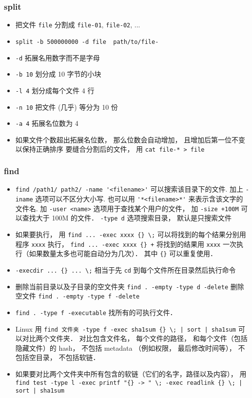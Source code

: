 \subsubsection{split}
\begin{itemize}
\item 把文件 \verb`file` 分割成 \verb`file-01`, \verb`file-02`, ...
\item \verb`split -b 500000000 -d file  path/to/file-`
\item \verb`-d` 拓展名用数字而不是字母
\item \verb`-b 10` 划分成 10 字节的小块
\item \verb`-l 4` 划分成每个文件 4 行
\item \verb`-n 10` 把文件 (几乎) 等分为 10 份
\item \verb`-a 4` 拓展名位数为 4
\item 如果文件个数超出拓展名位数， 那么位数会自动增加， 且增加后第一位不变以保持正确排序
要缝合分割后的文件， 用 \verb`cat file-* > file`
\end{itemize}


\subsubsection{find}
\begin{itemize}
\item \verb`find /path1/ path2/ -name '<filename>'` 可以搜索该目录下的文件. 加上 \verb`-iname` 选项可以不区分大小写. 也可以用 \verb`'*<filename>*'` 来表示含该文字的文件名. 加 \verb`-user <name>` 选项用于查找某个用户的文件， 加 \verb`-size +100M` 可以查找大于 100M 的文件． \verb`-type d` 选项搜索目录， 默认是只搜索文件
\item 如果要执行， 用 \verb`find ... -exec xxxx {} \;` 可以将找到的每个结果分别用程序 \verb`xxxx` 执行， \verb`find ... -exec xxxx {} +` 将找到的结果用 \verb`xxxx` 一次执行（如果数量太多也可能自动分为几次）． 其中 \verb`{}` 可以重复使用．
\item \verb`-execdir ... {} ... \;` 相当于先 \verb`cd` 到每个文件所在目录然后执行命令
\item 删除当前目录以及子目录的空文件夹 \verb`find . -empty -type d -delete` 删除空文件 \verb`find . -empty -type f -delete`
\item \verb|find . -type f -executable| 找所有的可执行文件．
\item Linux 用 \verb`find 文件夹 -type f -exec sha1sum {} \; | sort | sha1sum` 可以对比两个文件夹． 对比包含文件名， 每个文件的路径， 和每个文件（包括隐藏文件）的 hash， 不包括 metadata （例如权限， 最后修改时间等）， 不包括空目录， 不包括软链．
\item 如果要对比两个文件夹中所有包含的软链（它们的名字，路径以及内容）， 用 \verb`find test -type l -exec printf "{} -> " \; -exec readlink {} \; | sort | sha1sum`
\end{itemize}

